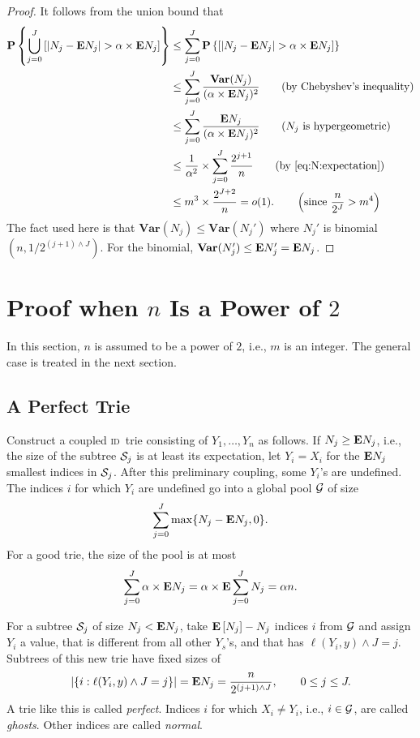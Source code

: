 \documentclass{article}
\newcommand{\id}{{\scshape id}}
\newcommand\cG{{\cal G}}
\newcommand\cS{{\cal S}}
\newcommand{\E}[1]{{\textbf E}\left[#1\right]}
\newcommand{\e}{{\textbf E}}
\newcommand{\va}{{\textbf{Var}}}
\newcommand{\p}[1]{{\textbf P}\left\{#1\right\}}
\begin{document}
\begin{proof}
    It follows from the union bound that
    \begin{align*}
        \p{\bigcup_{j=0}^J \left[ |N_j - \e N_j| > \alpha \times \e N_j \right]}
        & \le \sum_{j=0}^J \p{ \left[ |N_j - \e N_j| > \alpha \times \e N_j \right]} \\
        & \le \sum_{j=0}^J \frac{\va(N_j)}{(\alpha \times \e N_j )^2} \qquad \text{(by
        Chebyshev's inequality}) \\
        & \le \sum_{j=0}^J \frac{\e N_j}{(\alpha \times \e N_j )^2} \qquad
        \text{($N_j$ is hypergeometric)}\\
        & \le \frac{1}{\alpha^2} \times \sum_{j=0}^J \frac{2^{j+1}}{n} \qquad
        \text{(by \eqref{eq:N:expectation})}\\
        & \le m^3 \times \frac{2^{J+2}}{n}
        = o(1). \qquad \left(\text{since } \frac{n}{2^{J}} > m^4\right)
    \end{align*}
    The fact used here is that $\va(N_j) \le \va(N_j')$ where
    $N_j'$ is binomial $(n,1/2^{(j+1) \wedge J})$.
For the binomial, $\va(N_j') \le \e
    N_j' = \e N_j$.
\end{proof}

\section{Proof when $n$ Is a Power of $2$}

In this section, $n$ is assumed to be a power of $2$, i.e., $m$ is an integer.
The general case is treated in the next section.

\subsection{A Perfect Trie}

\label{sec:perfect}

Construct a coupled \id\ trie consisting of $Y_1,\ldots,Y_n$ as follows. If
$N_j \ge \e N_j$, i.e., the size of the subtree $\cS_j$ is at least its
expectation, let $Y_i = X_i$ for the $\e N_j$ smallest indices in $\cS_j$.
After this preliminary coupling, some $Y_i$'s are undefined. The indices $i$
for which $Y_i$ are undefined go into a global pool $\cG$ of size
$$
\sum_{j=0}^J \max\{N_j - \e N_j, 0 \}.
$$
For a good trie, the size of the pool is at most
$$
\sum_{j=0}^J \alpha \times \e N_j = \alpha \times \e \sum_{j=0}^J N_j = \alpha n.
$$

For a subtree $\cS_j$ of size $N_j < \e N_j$, take $\E{N_j} - N_j$ indices $i$ from
$\cG$ and assign $Y_i$ a value, that is different from all other $Y_s$'s, and
that has $\ell(Y_i,y) \wedge J = j$.  Subtrees of this new trie have fixed
sizes of
\begin{align}
    |\{i:\ell(Y_i,y) \wedge J=j\}|
    = \e N_j = \frac{n}{2^{(j+1) \wedge J}},
    \qquad 0 \le j \le J.
    \label{eq:Y}
\end{align}
A trie like this is called \emph{perfect}.  Indices $i$ for which $X_i
\ne Y_i$, i.e., $i \in \cG$, are called \emph{ghosts}. Other indices are
called \emph{normal}.
\end{document}
